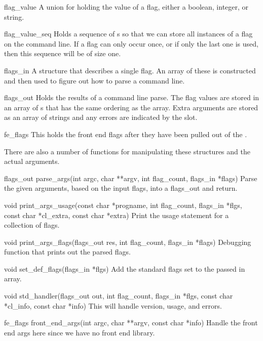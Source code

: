 \begin{ctypelist}
  \item[flag_value] A union for holding the value of a flag, either a
  boolean, integer, or string.

  \item[flag_value_seq] Holds a sequence of s so that
  we can store all instances of a flag on the command line.  If a flag can only
  occur once, or if only the last one is used, then this sequence will be of
  size one.

  \item[flags_in] A structure that describes a single flag.  An array of
  these is constructed and then used to figure out how to parse a command line.

  \item[flags_out] Holds the results of a command line parse.  The flag
  values are stored in an array of s that has the same
  ordering as the  array.  Extra arguments are stored as an
  array of strings and any errors are indicated by the 
  slot.

  \item[fe_flags] This holds the front end flags after they have been
  pulled out of the .
\end{ctypelist}

There are also a number of functions for manipulating these structures and the
actual arguments.

\begin{cprototypelist}
%
  \item[{flags_out parse_args(int argc, char **argv, int flag_count,
        flags_in *flags)}]
  Parse the given arguments, based on the input
  flags, into a flags_out and return.

  \item[void print_args_usage(const char *progname, int flag_count,
  flags_in *flgs, const char *cl_extra, const char *extra)] Print the usage
  statement for a collection of flags.

  \item[void print_args_flags(flags_out res, int flag_count,
  flags_in *flags)] Debugging function that prints out the parsed flags.

  \item[void set_def_flags(flags_in *flgs)] Add the standard flags
  set to the passed in array.

  \item[void std_handler(flags_out out, int flag_count, flags_in
  *flgs, const char *cl_info, const char *info)] This will handle version,
  usage, and errors.

  \item[fe_flags front_end_args(int argc, char **argv, const char
  *info)] Handle the front end args here since we have no front end library.
\end{cprototypelist}

